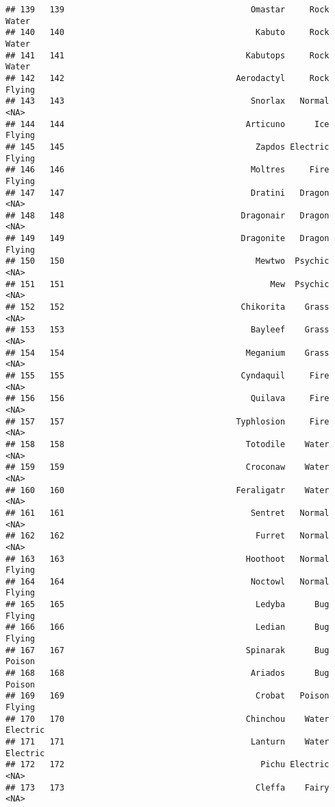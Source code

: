 \documentclass[
]{article}
\begin{document}
\begin{verbatim}
## 139   139                                      Omastar     Rock    Water
## 140   140                                       Kabuto     Rock    Water
## 141   141                                     Kabutops     Rock    Water
## 142   142                                   Aerodactyl     Rock   Flying
## 143   143                                      Snorlax   Normal     <NA>
## 144   144                                     Articuno      Ice   Flying
## 145   145                                       Zapdos Electric   Flying
## 146   146                                      Moltres     Fire   Flying
## 147   147                                      Dratini   Dragon     <NA>
## 148   148                                    Dragonair   Dragon     <NA>
## 149   149                                    Dragonite   Dragon   Flying
## 150   150                                       Mewtwo  Psychic     <NA>
## 151   151                                          Mew  Psychic     <NA>
## 152   152                                    Chikorita    Grass     <NA>
## 153   153                                      Bayleef    Grass     <NA>
## 154   154                                     Meganium    Grass     <NA>
## 155   155                                    Cyndaquil     Fire     <NA>
## 156   156                                      Quilava     Fire     <NA>
## 157   157                                   Typhlosion     Fire     <NA>
## 158   158                                     Totodile    Water     <NA>
## 159   159                                     Croconaw    Water     <NA>
## 160   160                                   Feraligatr    Water     <NA>
## 161   161                                      Sentret   Normal     <NA>
## 162   162                                       Furret   Normal     <NA>
## 163   163                                     Hoothoot   Normal   Flying
## 164   164                                      Noctowl   Normal   Flying
## 165   165                                       Ledyba      Bug   Flying
## 166   166                                       Ledian      Bug   Flying
## 167   167                                     Spinarak      Bug   Poison
## 168   168                                      Ariados      Bug   Poison
## 169   169                                       Crobat   Poison   Flying
## 170   170                                     Chinchou    Water Electric
## 171   171                                      Lanturn    Water Electric
## 172   172                                        Pichu Electric     <NA>
## 173   173                                       Cleffa    Fairy     <NA>

\end{verbatim}
\end{document}
